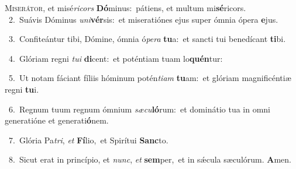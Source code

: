 \lettrine{\initial\textcolor{\initialcolor}{M}}{iserátor,} et misé\-\textit{ri}\-\textit{cors} \textbf{Dó}\-minus:~\star pátiens, et multum mi\-\textbf{sé}\-ricors.\\
{\numbfont\textcolor{\numbcolor}{~2.}}~Suávis Dóminus \textit{u}\-\textit{ni}\textbf{vér}sis:~\star et miseratiónes ejus super ómnia ópera \textbf{e}\-jus.\par
{\numbfont\textcolor{\numbcolor}{~3.}}~Confiteántur tibi, Dómine, ómnia ó\-\textit{pe}\-\textit{ra} \textbf{tu}\-a:~\star et sancti tui benedícant \textbf{ti}\-bi.\par
{\numbfont\textcolor{\numbcolor}{~4.}}~Glóriam regni \textit{tu}\-\textit{i} \textbf{di}\-cent:~\star et poténtiam tuam lo\-\textbf{quén}\-tur:\par
{\numbfont\textcolor{\numbcolor}{~5.}}~Ut notam fáciant fíliis hóminum potén\-\textit{ti}\-\textit{am} \textbf{tu}\-am:~\star et glóriam magnificéntiæ regni \textbf{tu}\-i.\par
{\numbfont\textcolor{\numbcolor}{~6.}}~Regnum tuum regnum ómnium \textit{sæ}\-\textit{cu}\textbf{ló}rum:~\star et dominátio tua in omni generatióne et generati\-\textbf{ó}\-nem.\par
{\numbfont\textcolor{\numbcolor}{~7.}}~Glória Pa\-\textit{tri}\-, \textit{et} \textbf{Fí}\-lio,~\star et Spirítui \textbf{Sanc}\-to.\par
{\numbfont\textcolor{\numbcolor}{~8.}}~Sicut erat in princípio, et \textit{nunc}\-, \textit{et} \textbf{sem}\-per,~\star et in sǽcula sæculórum. \textbf{A}\-men.\par
